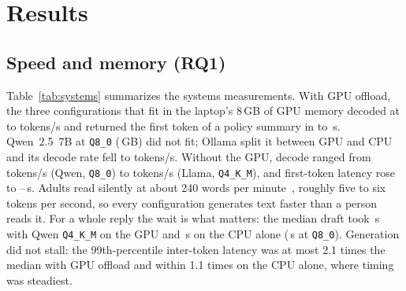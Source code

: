 \documentclass[sigconf,nonacm]{acmart}
\newcommand{\fitbox}[2]{\sbox{\fitboxbox}{#2}%
  \ifdim\wd\fitboxbox>#1\resizebox{#1}{!}{\usebox{\fitboxbox}}\else\usebox{\fitboxbox}\fi}
\begin{document}
\section{Results}

\subsection{Speed and memory (RQ1)}
Table~\ref{tab:systems} summarizes the systems measurements.
With GPU offload, the three configurations that fit in the laptop's 8\,GB of GPU memory decoded at \TpsIntelQwenQfour{} to \TpsIntelLlamaQfour{} tokens/s and returned the first token of a policy summary in \TtftIntelLlamaQeight{} to \TtftIntelQwenQfour{}\,s.
Qwen~2.5~7B at \texttt{Q8\_0} (\SizeIntelQwenQeight{}\,GB) did not fit; Ollama split it between GPU and CPU and its decode rate fell to \TpsIntelQwenQeight{} tokens/s.
Without the GPU, decode ranged from \TpsIntelNoGPUQwenQeight{} tokens/s (Qwen, \texttt{Q8\_0}) to \TpsIntelNoGPULlamaQfour{} tokens/s (Llama, \texttt{Q4\_K\_M}), and first-token latency rose to \TtftIntelNoGPULlamaQfour{}--\TtftIntelNoGPUQwenQeight{}\,s.
Adults read silently at about 240 words per minute~\cite{brysbaert2019reading}, roughly five to six tokens per second, so every configuration generates text faster than a person reads it.
For a whole reply the wait is what matters: the median draft took \DraftSecIntelQwenQfour{}\,s with Qwen \texttt{Q4\_K\_M} on the GPU and \DraftSecIntelNoGPUQwenQfour{}\,s on the CPU alone (\DraftSecIntelNoGPUQwenQeight{}\,s at \texttt{Q8\_0}).
Generation did not stall: the 99th-percentile inter-token latency was at most 2.1 times the median with GPU offload and within 1.1 times on the CPU alone, where timing was steadiest.

\begin{table}[t]
\caption{Systems measurements. Decode throughput is mean $\pm$ s.d. across requests. TTFT is the median for policy prompts. Inter-token latency is pooled over all extraction, policy and drafting requests.}
\label{tab:systems}
\small
\fitbox{\textwidth}{}
\end{table}
\end{document}
